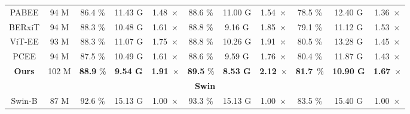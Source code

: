 \begin{table*}
\begin{tabular}{c|c|ccc|ccc|ccc}
  PABEE                                           & 94 M                                & 86.4 \%          & 11.43 G                    & 1.48~$\times$                & 88.6 \%          & 11.00 G                    & 1.54~$\times$                & 78.5 \%          & 12.40 G                    & 1.36~$\times$                 \\
  BERxiT                                          & 94 M                                & 88.3 \%          & 10.48 G                    & 1.61~$\times$                & 88.8 \%          & 9.16 G                     & 1.85~$\times$                & 79.1 \%          & 11.12 G                    & 1.53~$\times$                 \\
  ViT-EE                                          & 93 M                                & 88.3 \%          & 11.07 G                    & 1.75~$\times$                & 88.8 \%          & 10.26 G                    & 1.91~$\times$                & 80.5 \%          & 13.28 G                    & 1.45~$\times$                 \\
  PCEE                                            & 94 M                                & 87.5 \%          & 10.49 G                    & 1.61~$\times$                & 88.6 \%          & 9.59 G                     & 1.76~$\times$                & 80.4 \%          & 11.87 G                    & 1.43~$\times$                 \\
  \rowcolor[rgb]{0.949,0.949,0.949} \textbf{Ours} & 102 M                               & \textbf{88.9} \% & \textbf{9.54 G}            & \textbf{1.91}~$\times$       & \textbf{89.5} \% & \textbf{8.53 G}            & \textbf{2.12}~$\times$       & \textbf{81.7}~\% & \textbf{10.90 G}           & \textbf{1.67}~$\times$        \\ 
  \hline
  \multicolumn{11}{c}{\textbf{Swin}}                                                                                                                                                                                                                                                                                                  \\ 
  \hline
  Swin-B                                          & 87 M                                & 92.6 \%          & 15.13 G                    & 1.00~$\times$                & 93.3 \%          & 15.13 G                    & 1.00~$\times$                & 83.5 \%          & 15.40 G                    & 1.00~$\times$                 \\ 

\end{tabular}
\end{table*}
